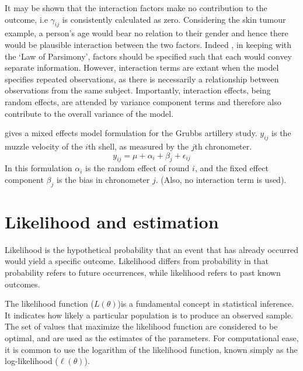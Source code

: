 \documentclass[12pt, a4paper]{report}
\theoremstyle{plain}
\theoremstyle{definition}
\theoremstyle{remark}
\begin{document}
It may be shown that the interaction factors make no contribution
to the outcome, i.e $\gamma_{ij}$ is consistently calculated as
zero. Considering the skin tumour example, a person's age would
bear no relation to their gender and hence there would be
plausible interaction between the two factors. Indeed , in keeping
with the `Law of Parsimony', factors should be specified such that
each would convey separate information. However, interaction terms
are extant when the model specifies repeated observations, as
there is necessarily a relationship between observations from the
same subject. Importantly, interaction effects, being random
effects, are attended by variance component terms and therefore
also contribute to the overall variance of the model.

\citet{Searle} gives a mixed effects model formulation for the
Grubbs artillery study. $y_{ij}$ is the muzzle velocity of the
$i$th shell, as measured by the $j$th chronometer.
\begin{equation}
y_{ij} = \mu + \alpha_{i} + \beta_{j}  + \epsilon_{ij}
\end{equation}
In this formulation $\alpha_{i}$ is the random effect of round
$i$, and the fixed effect component $\beta_{j}$ is the bias in
chronometer $j$. (Also, no interaction term is used).




\section{Likelihood and estimation}

 Likelihood is the hypothetical probability that an event that has already occurred would yield a specific outcome. Likelihood differs from probability in that probability refers to future occurrences, while likelihood refers to past known outcomes.

 The likelihood function ($L(\theta)$)is a fundamental concept in statistical inference. It indicates how likely a particular population is to produce an observed sample. The set of values that maximize the likelihood function are considered to be optimal, and are used as the estimates of the parameters. For computational ease, it is common to use the logarithm of the likelihood function, known simply as the log-likelihood ($\ell(\theta)$).


\newpage
\end{document}
